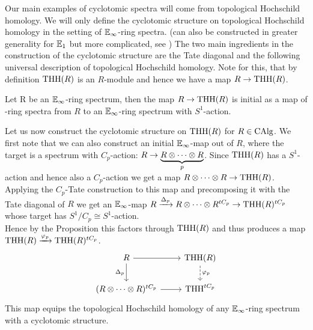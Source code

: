 Our main examples of cyclotomic spectra will come from topological Hochschild homology.
We will only define the cyclotomic structure on topological Hochschild homology in the setting of $\mathbb{E}_\infty$-ring spectra. (can also be constructed in greater generality for $\mathbb{E}_1$ but more complicated, see \cite[Chapter~3.1]{NS})
The two main ingredients in the construction of the cyclotomic structure are the Tate diagonal and the following universal description of topological Hochschild homology. Note for this, that by definition $\operatorname{THH}(R)$ is an $R$-module and hence we have a map $R\rightarrow\operatorname{THH}(R)$.

\begin{prop}
Let R be an $\mathbb{E}_\infty$-ring spectrum, then the map $R\rightarrow \operatorname{THH}(R)$ is initial as a map of \Einf-ring spectra from $R$ to an $\mathbb{E}_\infty$-ring spectrum with $S^1$-action.
\end{prop}
Let us now construct the cyclotomic structure on $\operatorname{THH}(R)$ for $R\in \operatorname{CAlg}$.
We first note that we can also construct an initial $\mathbb{E}_\infty$-map out of $R$, where the target is a spectrum with $C_p$-action: $R\rightarrow \underbrace{R\otimes\dots\otimes R}_{p}$.
Since $\operatorname{THH}(R)$ has a $S^1$-action and hence also a $C_p$-action we get a map $R\otimes\dots\otimes R\rightarrow \operatorname{THH}(R)$. Applying the $C_p$-Tate construction to this map and precomposing it with the Tate diagonal of $R$ we get an $\mathbb{E}_\infty$-map $R\xrightarrow{\Delta_p} R\otimes\dots\otimes R^{tC_p}\rightarrow \operatorname{THH}(R)^{tC_p}$ whose target has $S^1/C_p\cong S^1$-action.
\\
Hence by the Proposition this factors through $\operatorname{THH}(R)$ and thus produces a map $\operatorname{THH}(R)\xrightarrow{\varphi_p} \operatorname{THH}(R)^{tC_p}$.
\[\begin{tikzcd}
	{R} & {\text{THH}(R)} \\
	{(R\otimes\dots\otimes R)^{tC_p}} & {\text{THH}^{tC_p}}
	\arrow[from=1-1, to=1-2]
	\arrow["{\varphi_p}", from=1-2, to=2-2, dashed]
	\arrow["{\Delta_p}"', from=1-1, to=2-1]
	\arrow[from=2-1, to=2-2]
\end{tikzcd}\]
This map equips the topological Hochschild homology of any $\mathbb{E}_\infty$-ring spectrum with a cyclotomic structure. 